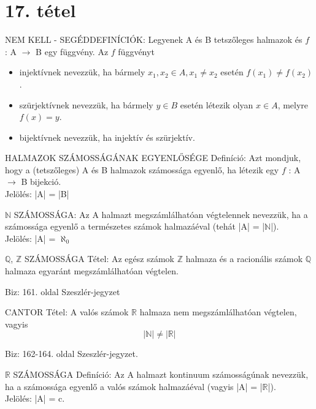 \section{17. tétel}

\begin{definicio}{
NEM KELL - SEGÉDDEFINÍCIÓK}: Legyenek A és B tetszőleges halmazok és $f$ : A $\to$ B egy függvény. Az $f$ függvényt
\begin{itemize}
\item injektívnek nevezzük, ha bármely $x_1, x_2 \in A, x_1 \neq x_2$ esetén $f(x_1) \neq f(x_2)$.
\item szürjektívnek nevezzük, ha bármely $y \in B$ esetén létezik olyan $x \in A$, melyre $f(x) = y$.
\item bijektívnek nevezzük, ha injektív és szürjektív.
\end{itemize}
\end{definicio}
\begin{definicio}{
HALMAZOK SZÁMOSSÁGÁNAK EGYENLŐSÉGE Definíció}: Azt mondjuk, hogy a (tetszőleges) A és B halmazok számossága egyenlő, ha létezik egy $f$ : A $\to$ B bijekció.\\
Jelölés: |A| = |B|
\end{definicio}
\begin{definicio}{
$\mathbb{N}$ SZÁMOSSÁGA}: Az A halmazt megszámlálhatóan végtelennek nevezzük, ha a számossága egyenlő a természetes számok halmazáéval (tehát |A| = |$\mathbb{N}$|).\\
Jelölés: |A| = $\aleph_0$
\end{definicio}
\begin{tetel}{
$\mathbb{Q}$, $\mathbb{Z}$ SZÁMOSSÁGA Tétel}: Az egész számok $\mathbb{Z}$ halmaza és a racionális számok $\mathbb{Q}$ halmaza egyaránt megszámlálhatóan végtelen.
\end{tetel}
\begin{leftbar}
Biz: 161. oldal Szeszlér-jegyzet
\end{leftbar}
\begin{tetel}{
CANTOR Tétel}: A valós számok $\mathbb{R}$ halmaza nem megszámlálhatóan végtelen, vagyis $$|\mathbb{N}| \neq |\mathbb{R}|$$
\end{tetel}
\begin{leftbar}
Biz: 162-164. oldal Szeszlér-jegyzet.
\end{leftbar}
\begin{definicio}{
$\mathbb{R}$ SZÁMOSSÁGA Definíció}: Az A halmazt kontinuum számosságúnak nevezzük, ha a számossága egyenlő a valós számok halmazáéval (vagyis |A| = |$\mathbb{R}$|).\\
Jelölés: |A| = c.
\end{definicio}
